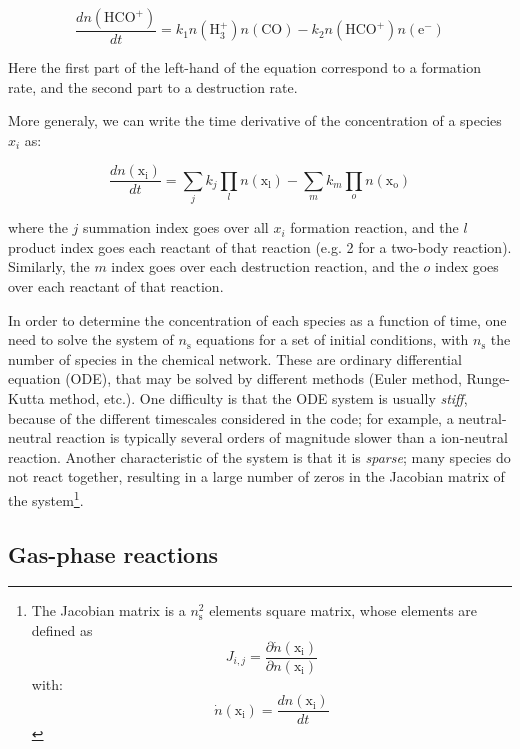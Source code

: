 \documentclass[a4paper,12pt]{article}
\newcommand{\conc}[1]{n(\mathrm{#1})}
\begin{document}
{\begin{equation}
  \frac{d\conc{HCO^{+}}}{dt} = k_{1} \conc{H_{3}^{+}} \conc{CO}
  - k_{2} \conc{HCO^{+}} \conc{e^{-}}
\end{equation}

\noindent
Here the first part of the left-hand of the equation correspond to a
formation rate, and the second part to a destruction rate.

More generaly, we can write the time derivative of the concentration
of a species $x_{i}$ as:

\begin{equation}
  \frac{d\conc{x_{i}}}{dt} = \sum_j k_{j} \prod_l \conc{x_{l}}
    - \sum_m k_{m} \prod_o \conc{x_{o}}
\end{equation}

\noindent
where the $j$ summation index goes over all $x_{i}$ formation
reaction, and the $l$ product index goes each reactant of that
reaction (e.g. 2 for a two-body reaction). Similarly, the $m$ index
goes over each destruction reaction, and the $o$ index goes over each
reactant of that reaction.

In order to determine the concentration of each species as a function
of time, one need to solve the system of $n_\mathrm{s}$ equations for
a set of initial conditions, with $n_\mathrm{s}$ the number of species
in the chemical network. These are ordinary differential equation
(ODE), that may be solved by different methods (Euler method,
Runge-Kutta method, etc.). One difficulty is that the ODE system is
usually \emph{stiff}, because of the different timescales considered
in the code; for example, a neutral-neutral reaction is typically
several orders of magnitude slower than a ion-neutral
reaction. Another characteristic of the system is that it is
\emph{sparse}; many species do not react together, resulting in a
large number of zeros in the Jacobian matrix of the
system\footnote{The Jacobian matrix is a $n_\mathrm{s}^2$ elements
  square matrix, whose elements are defined as
  \begin{equation}
    J_{i,j} = \frac{\partial
      \dot\conc{x_{i}}}{\partial \conc{x_{i}}}
  \end{equation}
  \noindent
  with:
  \begin{equation}
    \dot\conc{x_{i}} = \frac{d \conc{x_{i}}}{dt}
  \end{equation}}.
  
\subsection{Gas-phase reactions}
\label{sec:gas-phase-reactions}

}
\end{document}
